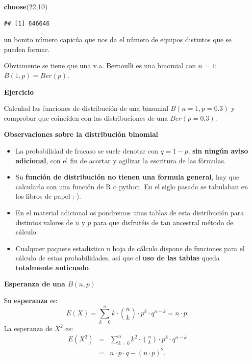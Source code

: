 \documentclass[]{book}
\newenvironment{Shaded}{\begin{snugshade}}{\end{snugshade}}
\newcommand{\DecValTok}[1]{\textcolor[rgb]{0.00,0.00,0.81}{#1}}
\newcommand{\KeywordTok}[1]{\textcolor[rgb]{0.13,0.29,0.53}{\textbf{#1}}}
\newcommand{\NormalTok}[1]{#1}
\providecommand{\tightlist}{%
  \setlength{\itemsep}{0pt}\setlength{\parskip}{0pt}}
\begin{document}
\begin{Shaded}
\begin{Highlighting}[]
\KeywordTok{choose}\NormalTok{(}\DecValTok{22}\NormalTok{,}\DecValTok{10}\NormalTok{)}
\end{Highlighting}
\end{Shaded}

\begin{verbatim}
## [1] 646646
\end{verbatim}

un bonito número capicúa que nos da el número de equipos distintos que se pueden formar.

Obviamente se tiene que una v.a. Bernoulli es una binomial con \(n=1\):
\(B(1,p)=Ber(p).\)

\textbf{Ejercicio}

Calculad las funciones de distribución de una binomial \(B(n=1,p=0.3)\) y comprobar que coinciden con las distribuciones de una \(Ber(p=0.3)\).

\textbf{Observaciones sobre la distribución binomial}

\begin{itemize}
\tightlist
\item
  La probabilidad de fracaso se suele denotar con \(q=1-p\), \textbf{sin ningún aviso adicional}, con el fin de acortar y agilizar la escritura de las fórmulas.
\item
  Su \textbf{función de distribución no tienen una formula general}, hay que calcularla con una función de R o python. En el siglo pasado se tabulaban en los libros de papel :-).
\item
  En el material adicional os pondremos unas tablas de esta distribución
  para distintos valores de \(n\) y \(p\) para que disfrutéis de tan ancestral método de cálculo.
\item
  Cualquier paquete estadístico u hoja de cálculo dispone de
  funciones para el cálculo de estas probabilidades, así que el \textbf{uso de las tablas} queda \textbf{totalmente anticuado}.
\end{itemize}

\textbf{Esperanza de una \(B(n,p)\)}

Su \textbf{esperanza} es:
\[E(X)=\displaystyle\sum_{k=0}^n k \cdot  {n \choose k }\cdot p^k\cdot q^{n-k} = n\cdot p.\]
La esperanza de \(X^2\) es:
\begin{eqnarray*}
E(X^2)&=& \displaystyle\sum_{k=0}^n k^2 \cdot  {n \choose k }\cdot p^k\cdot q^{n-k}\\
&=& n\cdot p\cdot q-(n\cdot p)^2.
\end{eqnarray*}
\end{document}
